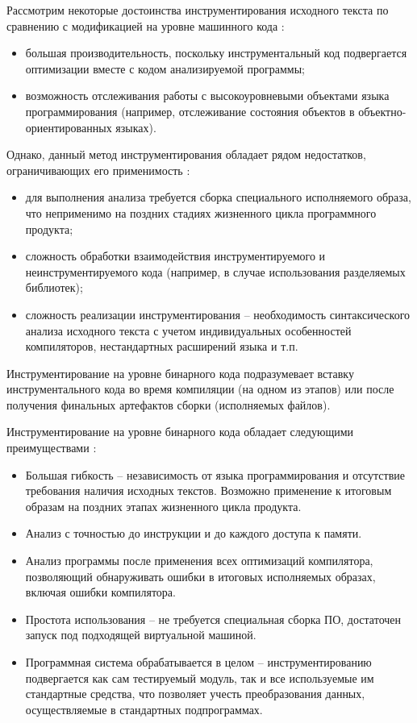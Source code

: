 Рассмотрим некоторые достоинства инструментирования исходного текста по сравнению с модификацией на уровне машинного кода \cite{lomakina2016testirovanie}:
\begin{itemize}
  \item большая производительность, поскольку инструментальный код подвергается оптимизации вместе с кодом анализируемой программы;
  \item возможность отслеживания работы с высокоуровневыми объектами языка программирования (например, отслеживание состояния объектов в объектно-ориентированных языках).
\end{itemize}

Однако, данный метод инструментирования обладает рядом недостатков, ограничивающих его применимость \cite{lomakina2016testirovanie}:
\begin{itemize}
  \item для выполнения анализа требуется сборка специального исполняемого образа, что неприменимо на поздних стадиях жизненного цикла программного продукта;
  \item сложность обработки взаимодействия инструментируемого и неинструментируемого кода (например, в случае использования разделяемых библиотек);
  \item сложность реализации инструментирования -- необходимость синтаксического анализа исходного текста с учетом индивидуальных особенностей компиляторов, нестандартных расширений языка и т.п.
\end{itemize}

Инструментирование на уровне бинарного кода подразумевает вставку инструментального кода во время компиляции (на одном из этапов) или после получения финальных артефактов сборки (исполняемых файлов).

Инструментирование на уровне бинарного кода обладает следующими преимуществами \cite{lomakina2016testirovanie}:
\begin{itemize}
  \item Большая гибкость -- независимость от языка программирования и отсутствие требования наличия исходных текстов. Возможно применение к итоговым образам на поздних этапах жизненного цикла продукта.
  \item Анализ с точностью до инструкции и до каждого доступа к памяти.
  \item Анализ программы после применения всех оптимизаций компилятора, позволяющий обнаруживать ошибки в итоговых исполняемых образах, включая ошибки компилятора.
  \item Простота использования -- не требуется специальная сборка ПО, достаточен запуск под подходящей виртуальной машиной.
  \item Программная система обрабатывается в целом -- инструментированию подвергается как сам тестируемый модуль, так и все используемые им стандартные средства, что позволяет учесть преобразования данных, осуществляемые в стандартных подпрограммах.
\end{itemize}


